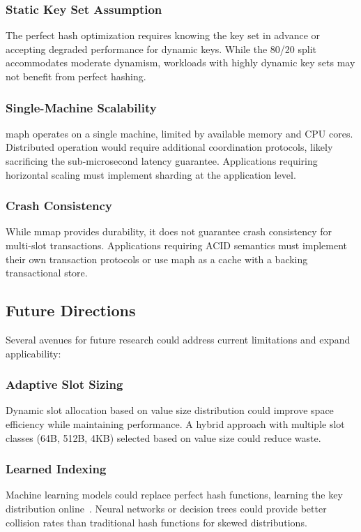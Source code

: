 \documentclass[11pt]{article}
\begin{document}
\subsubsection{Static Key Set Assumption}
The perfect hash optimization requires knowing the key set in advance or accepting degraded performance for dynamic keys. While the 80/20 split accommodates moderate dynamism, workloads with highly dynamic key sets may not benefit from perfect hashing.

\subsubsection{Single-Machine Scalability}
maph operates on a single machine, limited by available memory and CPU cores. Distributed operation would require additional coordination protocols, likely sacrificing the sub-microsecond latency guarantee. Applications requiring horizontal scaling must implement sharding at the application level.

\subsubsection{Crash Consistency}
While mmap provides durability, it does not guarantee crash consistency for multi-slot transactions. Applications requiring ACID semantics must implement their own transaction protocols or use maph as a cache with a backing transactional store.

\subsection{Future Directions}

Several avenues for future research could address current limitations and expand applicability:

\subsubsection{Adaptive Slot Sizing}
Dynamic slot allocation based on value size distribution could improve space efficiency while maintaining performance. A hybrid approach with multiple slot classes (64B, 512B, 4KB) selected based on value size could reduce waste.

\subsubsection{Learned Indexing}
Machine learning models could replace perfect hash functions, learning the key distribution online~\cite{learned-index}. Neural networks or decision trees could provide better collision rates than traditional hash functions for skewed distributions.
\end{document}
